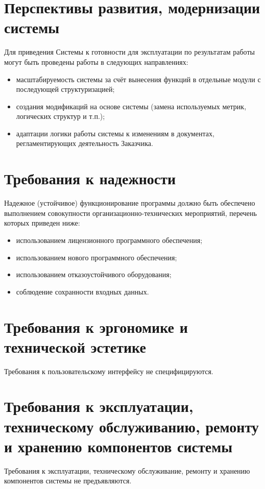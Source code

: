 \section{Перспективы развития, модернизации системы}
Для приведения Системы к готовности для эксплуатации по результатам работы могут быть 
проведены работы в следующих направлениях:
\begin{itemize}
    \item масштабируемость системы за счёт вынесения функций в отдельные модули с 
        последующей структуризацией;
    \item создания модификаций на основе системы (замена используемых метрик, логических 
        структур и т.п.);
    \item адаптации логики работы системы к изменениям в документах, регламентирующих 
        деятельность Заказчика.
\end{itemize}

\section{Требования к надежности}
Надежное (устойчивое) функционирование программы должно быть обеспечено выполнением совокупности 
организационно-технических мероприятий, перечень которых приведен ниже: 
\begin{itemize}
    \item использованием лицензионного программного обеспечения; 
    \item использованием нового программного обеспечения;
    \item использованием отказоустойчивого оборудования;
    \item соблюдение сохранности входных данных.
\end{itemize}

\section{Требования к эргономике и технической эстетике}
Требования к пользовательскому интерфейсу не специфицируются.

\section{Требования к эксплуатации, техническому обслуживанию, ремонту и хранению компонентов системы}
Требования к эксплуатации, техническому обслуживание, ремонту и хранению компонентов системы 
не предъявляются.

